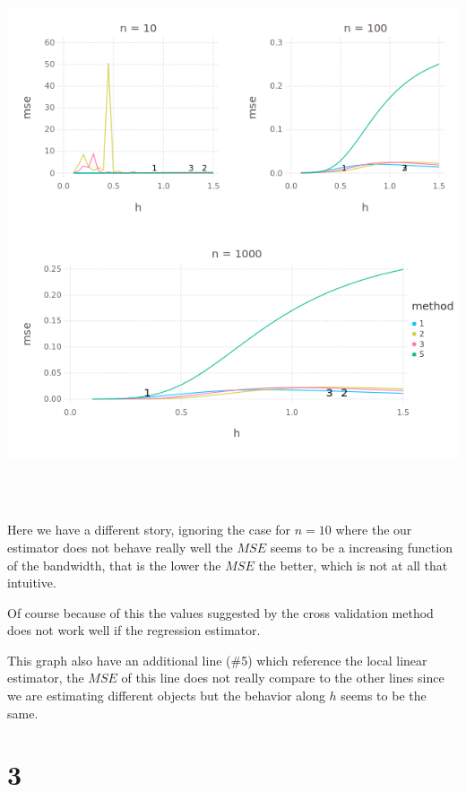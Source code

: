 \documentclass{article}
\begin{document}
\begin{center}
\includegraphics[width=16cm, height=16cm]{Q2-b.png}
\end{center}

Here we have a different story, ignoring the case for $n = 10$ where the our estimator
does not behave really well the $MSE$ seems to be a increasing function of the bandwidth,
that is the lower the $MSE$ the better, which is not at all that intuitive.

Of course because of this the values suggested by the cross validation method does not
work well if the regression estimator.

This graph also have an additional line (\#5) which reference the local linear estimator,
the $MSE$ of this line does not really compare to the other lines since we are estimating
different objects but the behavior along $h$ seems to be the same.

\section{3}
\end{document}
